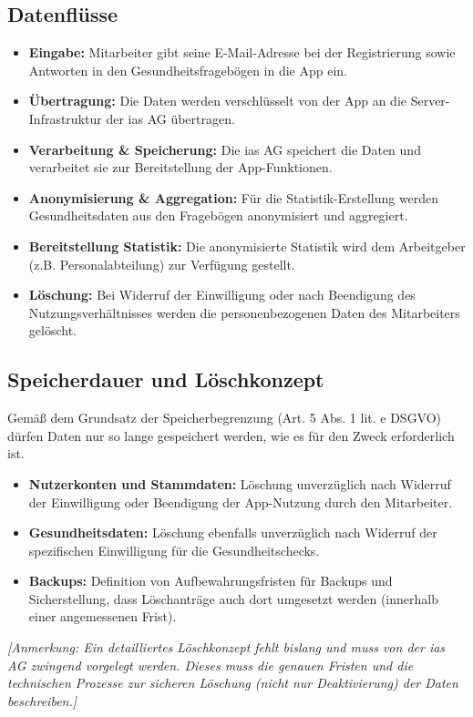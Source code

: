 \documentclass[12pt, a4paper]{article}
\begin{document}
\subsection{Datenflüsse}
\begin{itemize}
    \item \textbf{Eingabe:} Mitarbeiter gibt seine E-Mail-Adresse bei der Registrierung sowie Antworten in den Gesundheitsfragebögen in die App ein.
    \item \textbf{Übertragung:} Die Daten werden verschlüsselt von der App an die Server-Infrastruktur der ias AG übertragen.
    \item \textbf{Verarbeitung \& Speicherung:} Die ias AG speichert die Daten und verarbeitet sie zur Bereitstellung der App-Funktionen.
    \item \textbf{Anonymisierung \& Aggregation:} Für die Statistik-Erstellung werden Gesundheitsdaten aus den Fragebögen anonymisiert und aggregiert.
    \item \textbf{Bereitstellung Statistik:} Die anonymisierte Statistik wird dem Arbeitgeber (z.B. Personalabteilung) zur Verfügung gestellt.
    \item \textbf{Löschung:} Bei Widerruf der Einwilligung oder nach Beendigung des Nutzungsverhältnisses werden die personenbezogenen Daten des Mitarbeiters gelöscht.
\end{itemize}

\subsection{Speicherdauer und Löschkonzept}
Gemäß dem Grundsatz der Speicherbegrenzung (Art. 5 Abs. 1 lit. e DSGVO) dürfen Daten nur so lange gespeichert werden, wie es für den Zweck erforderlich ist.
\begin{itemize}
    \item \textbf{Nutzerkonten und Stammdaten:} Löschung unverzüglich nach Widerruf der Einwilligung oder Beendigung der App-Nutzung durch den Mitarbeiter.
    \item \textbf{Gesundheitsdaten:} Löschung ebenfalls unverzüglich nach Widerruf der spezifischen Einwilligung für die Gesundheitschecks.
    \item \textbf{Backups:} Definition von Aufbewahrungsfristen für Backups und Sicherstellung, dass Löschanträge auch dort umgesetzt werden (innerhalb einer angemessenen Frist).
\end{itemize}
\textit{[Anmerkung: Ein detailliertes Löschkonzept fehlt bislang und muss von der ias AG zwingend vorgelegt werden. Dieses muss die genauen Fristen und die technischen Prozesse zur sicheren Löschung (nicht nur Deaktivierung) der Daten beschreiben.]}
\end{document}
